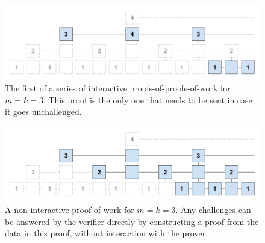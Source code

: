 \begin{figure}[h]
    \caption{The first of a series of interactive proofs-of-proofs-of-work for
    $m = k = 3$. This proof is the only one that needs to be sent in case it
    goes unchallenged.}
    \centering
    \includegraphics[width=\textwidth,keepaspectratio]{figures/interactive-popow.png}
\end{figure}

\begin{figure}[h]
    \caption{A non-interactive proof-of-work for $m = k = 3$. Any challenges
    can be answered by the verifier directly by constructing a proof from the
    data in this proof, without interaction with the prover.}
    \centering
    \includegraphics[width=\textwidth,keepaspectratio]{figures/non-interactive-popow.png}
\end{figure}
